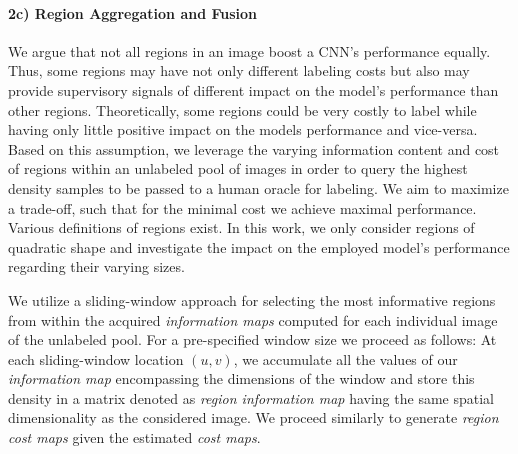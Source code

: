 \documentclass{bmvc2k}
\begin{document}
\vspace{-0.275cm}\paragraph{2c) Region Aggregation and Fusion}
We argue that not all regions in an image boost a CNN's performance equally. Thus, some regions may have not only different labeling costs but also may provide supervisory signals of different impact on the model's performance than other regions. Theoretically, some regions could be very costly to label while having only little positive impact on the models performance and vice-versa. Based on this assumption, we leverage the varying information content and cost of regions within an unlabeled pool of images in order to query the highest density samples to be passed to a human oracle for labeling. We aim to maximize a trade-off, such that for the minimal cost we achieve maximal performance. Various definitions of regions exist. In this work, we only consider regions of quadratic shape and investigate the impact on the employed model's performance regarding their varying sizes. 

We utilize a sliding-window approach for selecting the most informative regions from within the acquired {\it information maps} computed for each individual image of the unlabeled pool. For a pre-specified window size we proceed as follows: At each sliding-window location $(u,v)$, we accumulate all the values of our {\it information map} encompassing the dimensions of the window and store this density in a matrix denoted as {\it region information map} having the same spatial dimensionality as the considered image. We proceed similarly to generate {\it region cost maps} given the estimated {\it cost maps}. 
\end{document}
